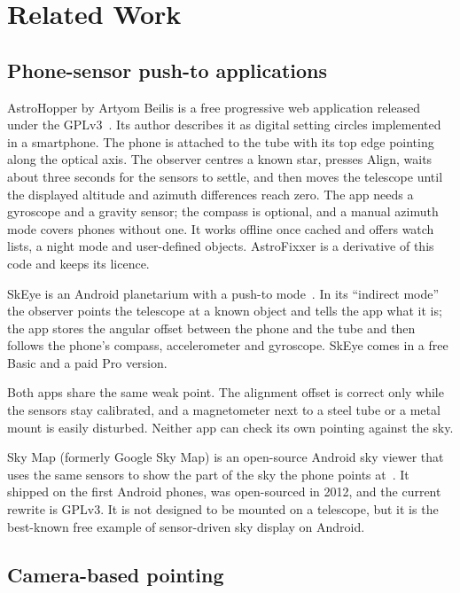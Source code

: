 \section{Related Work}
\label{sec:related}

\subsection{Phone-sensor push-to applications}

AstroHopper by Artyom Beilis is a free progressive web application released under the GPLv3~\cite{astrohopper}. Its author describes it as digital setting circles implemented in a smartphone. The phone is attached to the tube with its top edge pointing along the optical axis. The observer centres a known star, presses Align, waits about three seconds for the sensors to settle, and then moves the telescope until the displayed altitude and azimuth differences reach zero. The app needs a gyroscope and a gravity sensor; the compass is optional, and a manual azimuth mode covers phones without one. It works offline once cached and offers watch lists, a night mode and user-defined objects. AstroFixxer is a derivative of this code and keeps its licence.

SkEye is an Android planetarium with a push-to mode~\cite{skeye}. In its ``indirect mode'' the observer points the telescope at a known object and tells the app what it is; the app stores the angular offset between the phone and the tube and then follows the phone's compass, accelerometer and gyroscope. SkEye comes in a free Basic and a paid Pro version.

Both apps share the same weak point. The alignment offset is correct only while the sensors stay calibrated, and a magnetometer next to a steel tube or a metal mount is easily disturbed. Neither app can check its own pointing against the sky.

Sky Map (formerly Google Sky Map) is an open-source Android sky viewer that uses the same sensors to show the part of the sky the phone points at~\cite{skymap}. It shipped on the first Android phones, was open-sourced in 2012, and the current rewrite is GPLv3. It is not designed to be mounted on a telescope, but it is the best-known free example of sensor-driven sky display on Android.

\subsection{Camera-based pointing}

